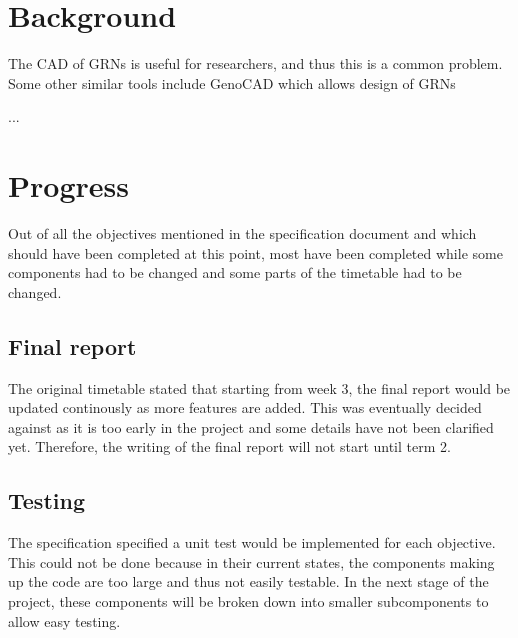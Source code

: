 \documentclass{article}
\begin{document}
	
	
	\section{Background}
	

	
	The CAD of GRNs is useful for researchers, and thus this is a common problem. Some other similar tools include GenoCAD which allows design of GRNs
	
	...
	
	
	
	\section{Progress}
	Out of all the objectives mentioned in the specification document and which should have been completed at this point, most have been completed while some components had to be changed and some parts of the timetable had to be changed.
	
	
	
	\subsection{Final report} 
	The original timetable stated that starting from week 3, the final report would be updated continously as more features are added. This was eventually decided against as it is too early in the project and some details have not been clarified yet. Therefore, the writing of the final report will not start until term 2.
	
	\subsection{Testing} \label{progress-testing}
	The specification specified a unit test would be implemented for each objective. This could not be done because in their current states, the components making up the code are too large and thus not easily testable. In the next stage of the project, these components will be broken down into smaller subcomponents to allow easy testing.
	
\end{document}
